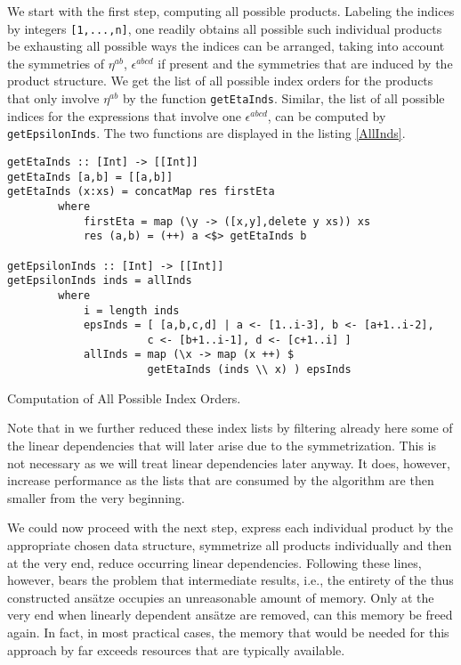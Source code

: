 We start with the first step, computing all possible products. Labeling the indices by integers \texttt{[1,...,n]}, one readily obtains all possible such individual products be exhausting all possible ways the indices can be arranged, taking into account the symmetries of $\eta^{ab}$, $\epsilon^{abcd}$ if present and the symmetries that are induced by the product structure. We get the list of all possible index orders for the products that only involve $\eta^{ab}$ by the function \texttt{getEtaInds}.
Similar, the list of all possible indices for the expressions that involve one $\epsilon^{abcd}$, can be computed by \texttt{getEpsilonInds}. The two functions are displayed in the listing \ref{AllInds}.
\begin{listing}[hbt!]
\begin{verbatim}
getEtaInds :: [Int] -> [[Int]]
getEtaInds [a,b] = [[a,b]]
getEtaInds (x:xs) = concatMap res firstEta
        where
            firstEta = map (\y -> ([x,y],delete y xs)) xs
            res (a,b) = (++) a <$> getEtaInds b 

getEpsilonInds :: [Int] -> [[Int]]
getEpsilonInds inds = allInds
        where
            i = length inds 
            epsInds = [ [a,b,c,d] | a <- [1..i-3], b <- [a+1..i-2],
                      c <- [b+1..i-1], d <- [c+1..i] ] 
            allInds = map (\x -> map (x ++) $
                      getEtaInds (inds \\ x) ) epsInds 
\end{verbatim} 
\caption{Computation of All Possible Index Orders.}\label{AllInds}
\end{listing}

Note that in \cite{sparse-tensor} we further reduced these index lists by filtering already here some of the linear dependencies that will later arise due to the symmetrization. This is not necessary as we will treat linear dependencies later anyway. It does, however, increase performance as the lists that are consumed by the algorithm are then smaller from the very beginning.  

We could now proceed with the next step, express each individual product by the appropriate chosen data structure, symmetrize all products individually and then at the very end, reduce occurring linear dependencies. Following these lines, however, bears the problem that intermediate results, i.e., the entirety of the thus constructed ansätze occupies an unreasonable amount of memory. Only at the very end when linearly dependent ansätze are removed, can this memory be freed again. In fact, in most practical cases, the memory that would be needed for this approach by far exceeds resources that are typically available.

